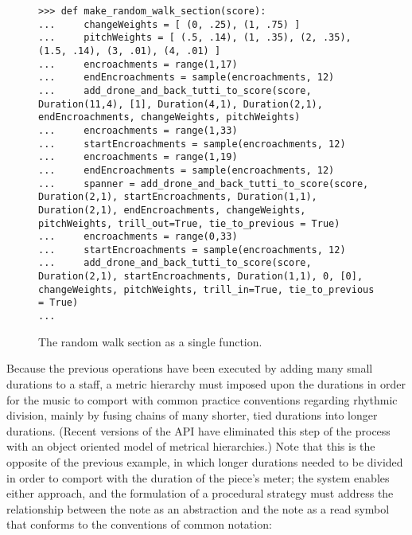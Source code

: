 \begin{figure}[H]
\begin{lstlisting}[basicstyle=\scriptsize\ttfamily, breaklines=True, tabsize=4, showtabs=false, showspaces=false]
>>> def make_random_walk_section(score):
...     changeWeights = [ (0, .25), (1, .75) ]
...     pitchWeights = [ (.5, .14), (1, .35), (2, .35), (1.5, .14), (3, .01), (4, .01) ]
...     encroachments = range(1,17)
...     endEncroachments = sample(encroachments, 12)
...     add_drone_and_back_tutti_to_score(score, Duration(11,4), [1], Duration(4,1), Duration(2,1), endEncroachments, changeWeights, pitchWeights)
...     encroachments = range(1,33)
...     startEncroachments = sample(encroachments, 12)
...     encroachments = range(1,19)
...     endEncroachments = sample(encroachments, 12)
...     spanner = add_drone_and_back_tutti_to_score(score, Duration(2,1), startEncroachments, Duration(1,1), Duration(2,1), endEncroachments, changeWeights, pitchWeights, trill_out=True, tie_to_previous = True)
...     encroachments = range(0,33)
...     startEncroachments = sample(encroachments, 12)
...     add_drone_and_back_tutti_to_score(score, Duration(2,1), startEncroachments, Duration(1,1), 0, [0], changeWeights, pitchWeights, trill_in=True, tie_to_previous = True)
... \end{lstlisting}

\caption{The random walk section as a single function. } 
\end{figure}

Because the previous operations have been executed by adding many small durations to a staff, a metric hierarchy must imposed upon the durations in order for the music to comport with common practice conventions regarding rhythmic division, mainly by fusing chains of many shorter, tied durations into longer durations. (Recent versions of the API have eliminated this step of the process with an object oriented model of metrical hierarchies.) Note that this is the opposite of the previous example, in which longer durations needed to be divided in order to comport with the duration of the piece's meter; the system enables either approach, and the formulation of a procedural strategy must address the relationship between the note as an abstraction and the note as a read symbol that conforms to the conventions of common notation:

